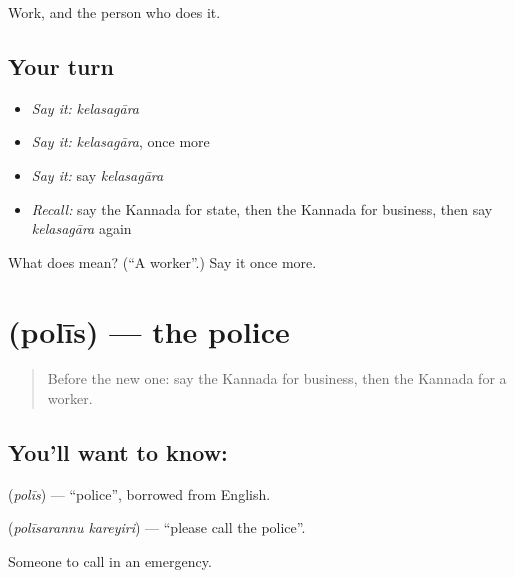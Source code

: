 \begin{grammarlens}[title={What you've built}]
Work, and the person who does it.
\end{grammarlens}

\subsection*{Your turn}
\begin{itemize}
\raggedright
  \item \emph{Say it:} \emph{kelasagāra}
  \item \emph{Say it:} \emph{kelasagāra}, once more
  \item \emph{Say it:} say \emph{kelasagāra}
  \item \emph{Recall:} say the Kannada for state, then the Kannada for business, then say \emph{kelasagāra} again
\end{itemize}

\begin{tcolorbox}[breakable,colback=teal!4,colframe=teal!35!black,title={Before you move on}]
What does  mean? (\textquotedblleft{}A worker\textquotedblright{}.) Say it once more.
\end{tcolorbox}
\section[\texorpdfstring{\kn{ಪೊಲೀಸ್} (polīs)}{ಪೊಲೀಸ್ (polīs)}]{ (polīs) — the police}

\label{lesson:KA-C104-police}



\begin{quote}
Before the new one: say the Kannada for business, then the Kannada for a worker.
\end{quote}

\subsection*{You'll want to know: }
\textbf{} (\emph{polīs}) — \textquotedblleft{}police\textquotedblright{}, borrowed from English.

\textbf{ } (\emph{polīsarannu kareyiri}) — \textquotedblleft{}please call the police\textquotedblright{}.

\begin{grammarlens}[title={What you've built}]
Someone to call in an emergency.
\end{grammarlens}

